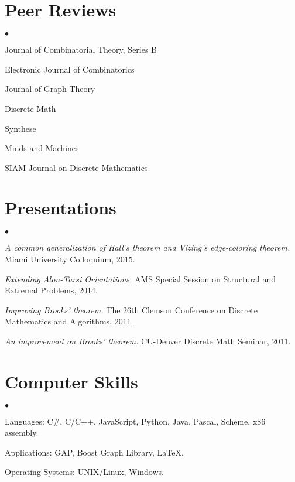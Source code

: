 \documentclass[margin,line]{res}
\newenvironment{list2}{
  \begin{list}{$\bullet$}{%
      \setlength{\itemsep}{0in}
      \setlength{\parsep}{0in} \setlength{\parskip}{0in}
      \setlength{\topsep}{0in} \setlength{\partopsep}{0in} 
      \setlength{\leftmargin}{0.2in}}}{\end{list}}
\begin{document}
\begin{resume}
\begin{enumerate}[{[}1{]}]
\end{enumerate}

\section{\sc Peer Reviews}
\begin{list2}
\item Journal of Combinatorial Theory, Series B
\item Electronic Journal of Combinatorics
\item Journal of Graph Theory
\item Discrete Math
\item Synthese
\item Minds and Machines
\item SIAM Journal on Discrete Mathematics
\end{list2}

\section{\sc Presentations}
\begin{list2}
\item \emph{A common generalization of Hall's theorem and Vizing's edge-coloring theorem.} Miami University Colloquium, 2015.
\item \emph{Extending Alon-Tarsi Orientations.} AMS Special Session on Structural and Extremal Problems, 2014.
\item \emph{Improving Brooks' theorem.} The 26th Clemson Conference on Discrete Mathematics and Algorithms, 2011.
\item \emph{An improvement on Brooks' theorem.} CU-Denver Discrete Math Seminar, 2011.
\end{list2}

\section{\sc Computer Skills} 
\begin{list2}
\item Languages: C\#, C/C++, JavaScript, Python, Java, Pascal, Scheme, x86 assembly.
\item Applications: GAP, Boost Graph Library, \LaTeX.
\item Operating Systems:  UNIX/Linux, Windows.
\end{list2}

\end{resume}
\end{document}
